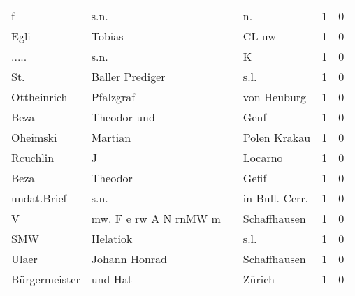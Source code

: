 \begin{tabular}{llllrr}
                        f &                               s.n. &             &                                         n.  &          1 &         0 \\
                     Egli &                             Tobias &             &                                       CL uw &          1 &         0 \\
                    ..... &                               s.n. &             &                                           K &          1 &         0 \\
                      St. &                    Baller Prediger &             &                                        s.l. &          1 &         0 \\
              Ottheinrich &                          Pfalzgraf &             &                                 von Heuburg &          1 &         0 \\
                     Beza &                        Theodor und &             &                                        Genf &          1 &         0 \\
                 Oheimski &                            Martian &             &                                Polen Krakau &          1 &         0 \\
                 Rcuchlin &                                  J &             &                                     Locarno &          1 &         0 \\
                     Beza &                            Theodor &             &                                       Gefif &          1 &         0 \\
              undat.Brief &                               s.n. &             &                             in Bull. Cerr.  &          1 &         0 \\
                        V &              mw. F e rw A N rnMW m &             &                                Schaffhausen &          1 &         0 \\
                      SMW &                           Helatiok &             &                                        s.l. &          1 &         0 \\
                    Ulaer &                      Johann Honrad &             &                                Schaffhausen &          1 &         0 \\
            Bürgermeister &                            und Hat &             &                                      Zürich &          1 &         0 \\

\end{tabular}
